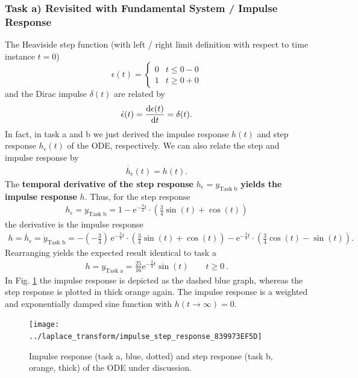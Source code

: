 \documentclass[11pt,a4paper,DIV=12]{scrartcl}
\begin{document}
\subsubsection{Task a) Revisited with Fundamental System / Impulse Response}
%
The Heaviside step function (with left / right limit definition with respect to
time instance $t=0$)
\begin{equation}
\epsilon(t) =
\begin{cases}
  0 & t\leq 0-0\\
  1 & t\geq 0+0
\end{cases}
\end{equation}
and
the Dirac impulse $\delta(t)$ are related by
\begin{align}
\dot{\epsilon}(t) = \frac{\mathrm{d} \epsilon(t)}{\mathrm{d} t} = \delta(t).
\end{align}
In fact, in task a and b we just derived the impulse response $h(t)$ and step response
$h_\epsilon(t)$ of the ODE, respectively.
%
We can also relate the step and impulse response by
\begin{align}
\dot{h_\epsilon}(t) = h(t).
\end{align}
%
The \textbf{temporal derivative of the step response} $h_\epsilon=y_\text{Task b}$
\textbf{yields the impulse response} $h$.
Thus, for the step response
\begin{align}
h_\epsilon = y_\text{Task b} =
1 - \mathrm{e}^{-\frac{3}{4} t} \cdot
\left( \frac{3}{4} \sin(t) + \cos(t)\right)
\end{align}
the derivative is the impulse response
\begin{align}
h = \dot{h_\epsilon} = \dot{y}_\text{Task b} =
 - (-\frac{3}{4})\,\mathrm{e}^{-\frac{3}{4} t} \cdot
\left( \frac{3}{4} \sin(t) + \cos(t)\right)
- \mathrm{e}^{-\frac{3}{4} t} \cdot
\left( \frac{3}{4} \cos(t) - \sin(t)\right).
\end{align}
Rearranging yields the expected result identical to task a
\begin{align}
\boxed{
h = y_\text{Task a} = \frac{25}{16} \mathrm{e}^{-\frac{3}{4} t} \sin(t) \qquad t\geq 0
}\,.
\end{align}
%
In Fig. \ref{fig:impulse_step_response} the impulse response is depicted as
the dashed blue graph, whereas the step response is plotted in thick
orange again.
The impulse response is a weighted and exponentially damped sine function
with $h(t\to\infty) = 0$.

\begin{figure}[h!]
\centering
\texttt{[image: ../laplace\_transform/impulse\_step\_response\_839973EF5D]}
\caption{Impulse response (task a, blue, dotted) and step response (task b, orange, thick)
of the ODE under discussion.}
\label{fig:impulse_step_response}
\end{figure}
\end{document}

